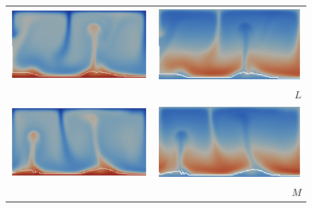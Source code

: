 \begin{figure}
\begin{tabular}{cr}
    \includegraphics[width=\twofigs]{chapters/vynnytska/png/tmL.png} &
    \includegraphics[width=\twofigs]{chapters/vynnytska/png/visL.png} \\& $L$ \\
    \includegraphics[width=\twofigs]{chapters/vynnytska/png/tmM.png} &
    \includegraphics[width=\twofigs]{chapters/vynnytska/png/visM.png} \\& $M$ \\

\end{tabular}
\end{figure}
